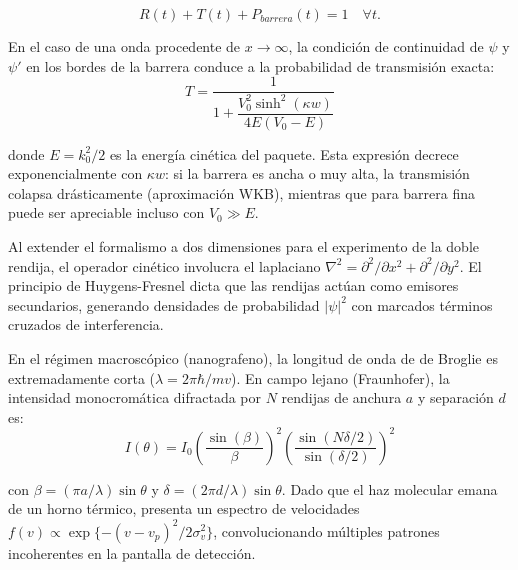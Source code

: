 \begin{equation}
    R(t)+T(t)+P_{barrera}(t) = 1 \quad\forall t.
    \label{eq:conservacion_prob}
\end{equation}

En el caso de una onda procedente de $x\to \infty$, la condición de continuidad de $\psi$ y $\psi'$ en los bordes de la barrera conduce a
la probabilidad de transmisión exacta:
\begin{equation}
    T = \frac{1}{1 + \dfrac{V_0^2 \sinh^2(\kappa w)}{4E(V_0-E)}}
    \label{eq:T_analitica}
\end{equation}

\noindent donde $E = k_0^2/2$ es la energía cinética del paquete. Esta expresión decrece exponencialmente con $\kappa w$: si la barrera es ancha o muy alta, la transmisión colapsa drásticamente (aproximación WKB), mientras que para barrera fina puede ser apreciable incluso con $V_0 \gg E$.

Al extender el formalismo a dos dimensiones para el experimento de la doble rendija, el operador cinético involucra el laplaciano $\nabla^2 = \partial^2/\partial x^2 + \partial^2/\partial y^2$. El principio de Huygens-Fresnel dicta que las rendijas actúan como emisores secundarios, generando densidades de probabilidad $|\psi|^2$ con marcados términos cruzados de interferencia.

En el régimen macroscópico (nanografeno), la longitud de onda de de Broglie es extremadamente corta ($\lambda = 2\pi\hbar/mv$). En campo lejano (Fraunhofer), la intensidad monocromática difractada por $N$ rendijas de anchura $a$ y separación $d$ es:
\begin{equation}
    I(\theta) = I_0 \left( \frac{\sin(\beta)}{\beta} \right)^2 \left( \frac{\sin(N\delta/2)}{\sin(\delta/2)} \right)^2
\end{equation}

con $\beta = (\pi a / \lambda)\sin\theta$ y $\delta = (2\pi d / \lambda)\sin\theta$. Dado que el haz molecular emana de un horno térmico, presenta un espectro de velocidades $f(v) \propto \exp\{-(v - v_p)^2 / 2\sigma_v^2\}$, convolucionando múltiples patrones incoherentes en la pantalla de detección.